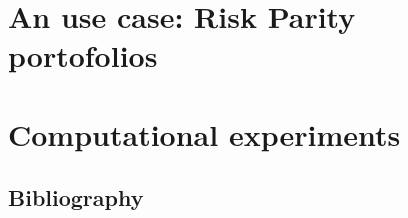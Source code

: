 \documentclass[smallextended]{svjour3}[2017 April 7th]
\begin{document}
\section{An use case: Risk Parity portofolios}

\clearpage
\section{Computational experiments}

\clearpage




\begin{thebibliography}{00}
\section{Bibliography}


\end{thebibliography}
\end{document}
